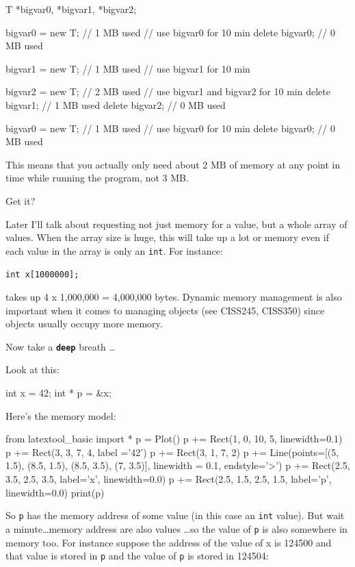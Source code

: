 \begin{consolethree}[escapeinside=||]
T *bigvar0, *bigvar1, *bigvar2;

bigvar0 = new T; // 1 MB used
// use bigvar0 for 10 min
delete bigvar0; // 0 MB used

bigvar1 = new T; // 1 MB used
// use bigvar1 for 10 min

bigvar2 = new T; // 2 MB used
// use bigvar1 and bigvar2 for 10 min
delete bigvar1; // 1 MB used
delete bigvar2; // 0 MB used

bigvar0 = new T; // 1 MB used
// use bigvar0 for 10 min
delete bigvar0; // 0 MB used
\end{consolethree}
This means that you actually only need about 2 MB of memory at any point
in time while running the program, not 3 MB.

Get it?

Later I'll talk about requesting not just memory for a value, but a whole array of values. When the array size is huge, this will take up a lot or memory even if each value in the array is only an \texttt{int}. For instance:

\texttt{int x[1000000];}

takes up 4 x 1,000,000 = 4,000,000 bytes. Dynamic memory management is also important when it comes to managing objects (see CISS245, CISS350) since objects usually occupy more memory.

\newpage{}

Now take a \texttt{\textbf{deep}} breath \ldots

Look at this:

\begin{consolethree}[escapeinside=||]
int x = 42;
int * p = &x;
\end{consolethree}
Here's the memory model:

\begin{python}
from latextool_basic import *
p = Plot()
p += Rect(1, 0, 10, 5, linewidth=0.1)
p += Rect(3, 3, 7, 4, label ='42')
p += Rect(3, 1, 7, 2)
p += Line(points=[(5, 1.5), (8.5, 1.5), (8.5, 3.5), (7, 3.5)], linewidth = 0.1, endstyle='>')
p += Rect(2.5, 3.5, 2.5, 3.5, label='x', linewidth=0.0)
p += Rect(2.5, 1.5, 2.5, 1.5, label='p', linewidth=0.0)
print(p)
\end{python}

So \texttt{p} has the memory address of some value (in this case an \texttt{int} value). But wait a minute\ldots memory address are also values \ldots so the value of \texttt{p} is also somewhere in memory too. For instance suppose the address of the value of x is 124500 and that value is stored in \texttt{p} and the value of \texttt{p} is stored in 124504:

